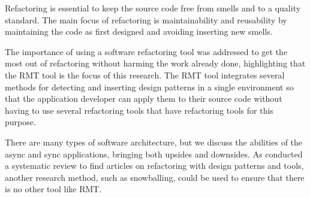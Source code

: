 Refactoring is essential to keep the source code free from smells and to a quality standard. The main focus of refactoring is maintainability and reusability by maintaining the code as first designed and avoiding inserting new smells.

The importance of using a software refactoring tool was addressed to get the most out of refactoring without harming the work already done, highlighting that the RMT tool is the focus of this research.
The RMT tool integrates several methods for detecting and inserting design patterns in a single environment so that the application developer can apply them to their source code without having to use several refactoring tools that have refactoring tools for this purpose.

There are many types of software architecture, but we discuss the abilities of the async and sync applications, bringing both upsides and downsides. As \textcite{beluzzo2018abordagem} conducted a systematic review to find articles on refactoring with design patterns and tools, another research method, such as snowballing, could be used to ensure that there is no other tool like RMT.